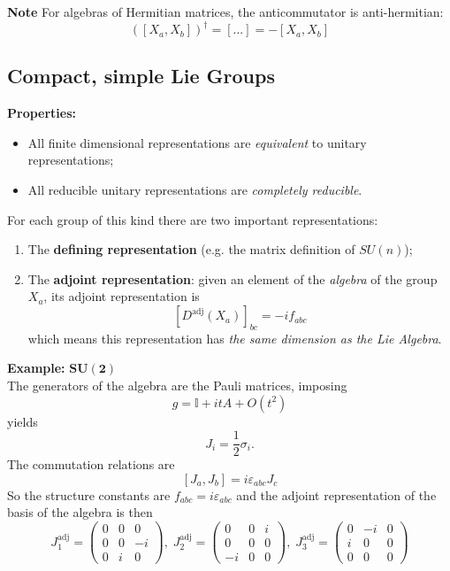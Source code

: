 
\textbf{Note} For algebras of Hermitian matrices, the anticommutator
is anti-hermitian:
\[
    \left(\left[X_a,X_b\right]\right)^\dagger =[...]=-\left[X_a,X_b\right]
\]
\subsection{Compact, simple Lie Groups}
\textbf{Properties:}
\begin{itemize}
    \item All finite dimensional representations are \textit{equivalent} to
        unitary representations;
    \item All reducible unitary representations are \textit{completely reducible}.
\end{itemize}

For each group of this kind there are two important representations:
\begin{enumerate}
    \item The \textbf{defining representation} (e.g. the matrix definition of
        $SU(n)$);
    \item The \textbf{adjoint representation}: given an element of the \textit{
        algebra} of the group $X_a$, its adjoint representation is
        \[
            \left[D^\text{adj}\left(X_a\right)\right]_{bc}= -if_{abc} 
        \]
        which means this representation has \textit{the same dimension as the
        Lie Algebra}.
\end{enumerate}
\textbf{Example:} $\mathbf{SU(2)}$\\
The generators of the algebra are the Pauli matrices, imposing
\[
    g=\mathbb{I}+itA+O(t^2)
\]
yields
\[
    J_i=\frac{1}{2}\sigma_i.
\]
The commutation relations are
\[
    \left[J_a,J_b\right]=i\varepsilon_{abc}J_c
\]
So the structure constants are $f_{abc}=i\varepsilon_{abc}$ and the
adjoint representation of the basis of the algebra is then
\[
    J_1^\text{adj}=\begin{pmatrix}
        0&0&0\\
        0&0&-i\\
        0&i&0
    \end{pmatrix},\;J_2^\text{adj}=\begin{pmatrix}
        0&0&i\\
        0&0&0\\
        -i&0&0
    \end{pmatrix},\;J_3^\text{adj}=\begin{pmatrix}
        0&-i&0\\
        i&0&0\\
        0&0&0
    \end{pmatrix} 
\]


